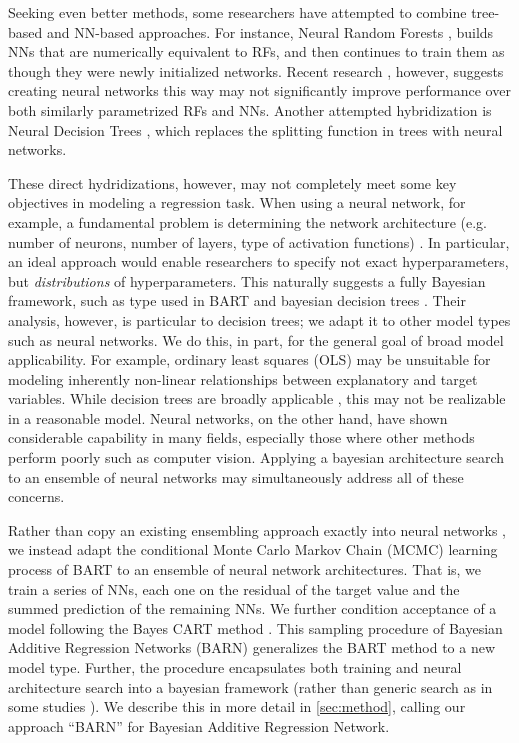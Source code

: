 \documentclass[12pt]{article}
\begin{document}
Seeking even better methods, some researchers have attempted to combine tree-based and NN-based approaches.  For instance, Neural Random Forests \cite{biau2019neural}, builds NNs that are numerically equivalent to RFs, and then continues to train them as though they were newly initialized networks.  Recent research \cite{vanboxel2021neural}, however, suggests creating neural networks this way may not significantly improve performance over both similarly parametrized RFs and NNs.  Another attempted hybridization is Neural Decision Trees \cite{balestriero2017neural}, which replaces the splitting function in trees with neural networks.

These direct hydridizations, however, may not completely meet some key objectives in modeling a regression task.  When using a neural network, for example, a fundamental problem is determining the network architecture (e.g. number of neurons, number of layers, type of activation functions) \cite{elsken2019neural}.  In particular, an ideal approach would enable researchers to specify not exact hyperparameters, but \emph{distributions} of hyperparameters.  This naturally suggests a fully Bayesian framework, such as type used in BART and bayesian decision trees \cite{chipman1998bayesian}.  Their analysis, however, is particular to decision trees; we adapt it to other model types such as neural networks.  We do this, in part, for the general goal of broad model applicability.  For example, ordinary least squares (OLS) may be unsuitable for modeling inherently non-linear relationships between explanatory and target variables.  While decision trees are broadly applicable \cite{breiman1984classification}, this may not be realizable in a reasonable model.  Neural networks, on the other hand, have shown considerable capability in many fields, especially those where other methods perform poorly \cite{schmidhuber2015deep} such as computer vision.  Applying a bayesian architecture search to an ensemble of neural networks may simultaneously address all of these concerns.

Rather than copy an existing ensembling approach exactly into neural networks \cite[for example]{biau2019neural}, we instead adapt the conditional Monte Carlo Markov Chain (MCMC) learning process of BART \cite{chipman2010bart} to an ensemble of neural network architectures.  That is, we train a series of NNs, each one on the residual of the target value and the summed prediction of the remaining NNs.  We further condition acceptance of a model following the Bayes CART method \cite{chipman1998bayesian}.  This sampling procedure of Bayesian Additive Regression Networks (BARN) generalizes the BART method to a new model type.  Further, the procedure encapsulates both training and neural architecture search into a bayesian framework (rather than generic search as in some studies \cite{idrissi2016genetic}).  We describe this in more detail in \autoref{sec:method}, calling our approach ``BARN'' for Bayesian Additive Regression Network.
\end{document}
